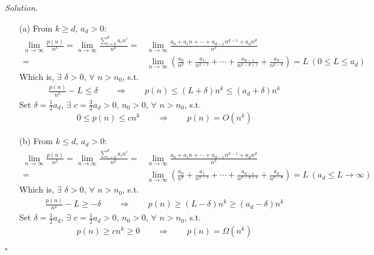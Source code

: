\documentclass[11pt]{article}
\theoremstyle{definition}
\newenvironment{solution}{\noindent\emph{Solution.}}{\hfill$\square$}
\begin{document}
\begin{solution}
  \begin{enumerate}
    \item[(a)]
    From $k \geq d$, $a_d > 0$:
    \begin{align*}
    \lim_{n \to \infty} \frac{p(n)}{n^k} 
    =\lim_{n \to \infty} \frac{\sum_{i=0}^d a_i n^i}{n^k} 
    =&\lim_{n \to \infty} \frac{a_0 + a_1 n + \cdots + a_{d-1} n^{d-1} + a_d n^d}{n^k} \\
    =&\lim_{n \to \infty} \left( \frac{a_0}{n^k} + \frac{a_1}{n^{k-1}} + \cdots + \frac{a_{d-1}}{n^{k-d+1}} + \frac{a_d}{n^{k-d}} \right) 
    =L \ (0 \leq L \leq a_d)
    \end{align*}
    Which is, $\exists$ $\delta > 0$, $\forall$ $n > n_0$, s.t.
    \begin{align*}
    \frac{p(n)}{n^k} - L \leq \delta \qquad \Rightarrow \qquad
    p(n) \leq (L + \delta) n^k \leq (a_d + \delta) n^k
     \end{align*}
     Set $\delta = \frac{1}{2}a_d$, $\exists$ $c = \frac{3}{2}a_d > 0$, $n_0 > 0$, $\forall$ $n > n_0$, s.t.
     \begin{align*}
    0 \leq p(n) \leq cn^k \qquad \Rightarrow \qquad
    p(n) = O(n^k)
     \end{align*}
     
    \item[(b)]
    From $k \leq d$, $a_d > 0$:
    \begin{align*}
    \lim_{n \to \infty} \frac{p(n)}{n^k} 
    =\lim_{n \to \infty} \frac{\sum_{i=0}^d a_i n^i}{n^k} 
    =&\lim_{n \to \infty} \frac{a_0 + a_1 n + \cdots + a_{d-1} n^{d-1} + a_d n^d}{n^k} \\
    =&\lim_{n \to \infty} \left( \frac{a_0}{n^k} + \frac{a_1}{n^{k-1}} + \cdots + \frac{a_{d-1}}{n^{k-d+1}} + \frac{a_d}{n^{k-d}} \right) 
    =L \ (a_d \leq L \rightarrow \infty)
    \end{align*}
    Which is, $\exists$ $\delta > 0$, $\forall$ $n > n_0$, s.t.
    \begin{align*}
    \frac{p(n)}{n^k} - L \geq -\delta \qquad \Rightarrow \qquad
    p(n) \geq (L - \delta) n^k \geq (a_d - \delta) n^k
     \end{align*}
     Set $\delta = \frac{1}{2}a_d$, $\exists$ $c = \frac{1}{2}a_d > 0$, $n_0 > 0$, $\forall$ $n > n_0$, s.t.
     \begin{align*}
    p(n) \geq cn^k \geq 0 \qquad \Rightarrow \qquad
    p(n) = \Omega(n^k)
     \end{align*}
    

\end{enumerate}
\end{solution}
\end{document}
